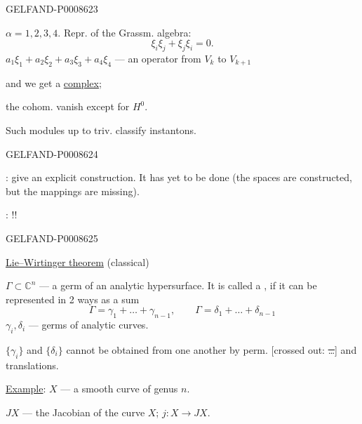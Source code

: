 \begin{GelfandAdjacentEvidence}{GELFAND-P000862}{3}

\(\alpha=1,2,3,4\). \quad Repr. of the Grassm. algebra:
\[
\xi_i\xi_j+\xi_j\xi_i=0.
\]
\(a_1\xi_1+a_2\xi_2+a_3\xi_3+a_4\xi_4\) — an operator from \(V_k\) to \(V_{k+1}\)

and we get a \uline{complex};

the cohom. vanish except for \(H^0\).

Such modules up to triv. classify instantons.
\end{GelfandAdjacentEvidence}
\begin{GelfandAdjacentEvidence}{GELFAND-P000862}{4}


: give an explicit construction. It has yet to be done (the spaces are constructed, but the mappings are missing).

: !!

\end{GelfandAdjacentEvidence}
\begin{GelfandAdjacentEvidence}{GELFAND-P000862}{5}


\uline{Lie–Wirtinger theorem} (classical)

\(\Gamma\subset\mathbb C^n\) — a germ of an analytic hypersurface.
It is called a , if it can be represented in 2 ways as a sum
\[
\Gamma=\gamma_1+\ldots+\gamma_{n-1},
\qquad
\Gamma=\delta_1+\ldots+\delta_{n-1}
\]
\(\gamma_i,\delta_i\) — germs of analytic curves.

\(\{\gamma_i\}\) and \(\{\delta_i\}\) cannot be obtained from one another by perm.
[crossed out: \sout{…}] and translations.
\end{GelfandAdjacentEvidence}


\uline{Example}: \(X\) — a smooth curve of genus \(n\).

\(JX\) — the Jacobian of the curve \(X\); \quad \(j:X\longrightarrow JX\).


